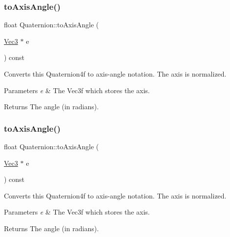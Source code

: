 \subsubsection{\texorpdfstring{to\+Axis\+Angle()}{toAxisAngle()}\hspace{0.1cm}{\footnotesize\ttfamily [1/2]}}
{\footnotesize\ttfamily float Quaternion\+::to\+Axis\+Angle (\begin{DoxyParamCaption}\item[{\hyperlink{classVec3}{Vec3} $\ast$}]{e }\end{DoxyParamCaption}) const}

Converts this Quaternion4f to axis-\/angle notation. The axis is normalized.


\begin{DoxyParams}{Parameters}
{\em e} & The Vec3f which stores the axis.\\
\hline
\end{DoxyParams}
\begin{DoxyReturn}{Returns}
The angle (in radians). 
\end{DoxyReturn}
\mbox{\label{classQuaternion_a122b18b294be2543bbc17cc1c7d8e25c}} 
\subsubsection{\texorpdfstring{to\+Axis\+Angle()}{toAxisAngle()}\hspace{0.1cm}{\footnotesize\ttfamily [2/2]}}
{\footnotesize\ttfamily float Quaternion\+::to\+Axis\+Angle (\begin{DoxyParamCaption}\item[{\hyperlink{classVec3}{Vec3} $\ast$}]{e }\end{DoxyParamCaption}) const}

Converts this Quaternion4f to axis-\/angle notation. The axis is normalized.


\begin{DoxyParams}{Parameters}
{\em e} & The Vec3f which stores the axis.\\
\hline
\end{DoxyParams}
\begin{DoxyReturn}{Returns}
The angle (in radians). 
\end{DoxyReturn}
\mbox{\label{classQuaternion_a4e1623a2a43917b71d48953a1b712366}} 
